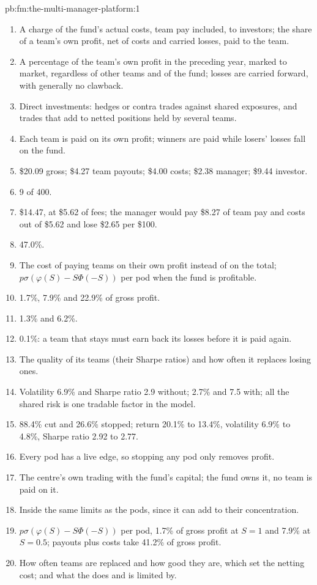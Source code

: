 \begin{solution}{pb:fm:the-multi-manager-platform:1}
\begin{enumerate}
\item A charge of the fund's actual costs, team pay included, to investors; the share of a team's own profit, net of costs and carried losses,
paid to the team.
\item A percentage of the team's own profit in the preceding year, marked to market, regardless of other teams and of the fund; losses are carried
forward, with generally no clawback.
\item Direct investments: hedges or contra trades against shared exposures, and trades that add to netted positions held by several teams.
\item Each team is paid on its own profit; winners are paid while losers' losses fall on the fund.
\item \$20.09 gross; \$4.27 team payouts; \$4.00 costs; \$2.38 manager; \$9.44 investor.
\item 9 of 400.
\item \$14.47, at \$5.62 of fees; the manager would pay \$8.27 of team pay and costs out of \$5.62 and lose \$2.65 per \$100.
\item 47.0\%.
\item The cost of paying teams on their own profit instead of on the total;
$p\sigma(\varphi(S)-S\Phi(-S))$ per pod when the fund is profitable.
\item 1.7\%, 7.9\% and 22.9\% of gross profit.
\item 1.3\% and 6.2\%.
\item 0.1\%: a team that stays must earn back its losses before it is paid again.
\item The quality of its teams (their Sharpe ratios) and how often it replaces losing ones.
\item Volatility 6.9\% and Sharpe ratio 2.9 without; 2.7\% and 7.5 with; all the shared risk is one tradable factor in the model.
\item 88.4\% cut and 26.6\% stopped; return 20.1\% to 13.4\%, volatility 6.9\% to 4.8\%, Sharpe ratio 2.92 to 2.77.
\item Every pod has a live edge, so stopping any pod only removes profit.
\item The centre's own trading with the fund's capital; the fund owns it, no team is paid on it.
\item Inside the same limits as the pods, since it can add to their concentration.
\item $p\sigma(\varphi(S)-S\Phi(-S))$ per pod, 1.7\% of gross profit at $S=1$ and 7.9\% at $S=0.5$; payouts plus costs take 41.2\% of gross profit.
\item How often teams are replaced and how good they are, which set the netting cost; and what the  does and is limited by.
\end{enumerate}
\end{solution}


